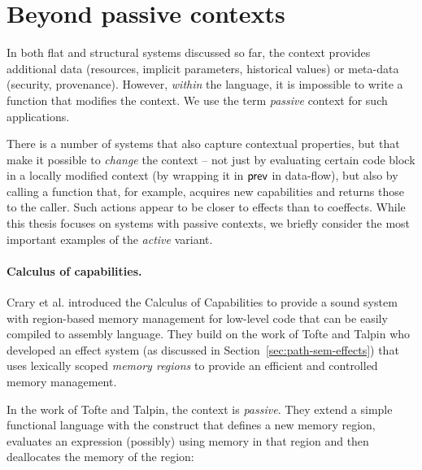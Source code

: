 
\section{Beyond passive contexts}

In both flat and structural systems discussed so far, the context provides additional data (resources,
implicit parameters, historical values) or meta-data (security, provenance). However, \emph{within}
the language, it is impossible to write a function that modifies the context. We use the term
\emph{passive} context for such applications.

There is a number of systems that also capture contextual properties, but that make it possible to
\emph{change} the context -- not just by evaluating certain code block in a locally modified context
(\eg by wrapping it in $\textnormal{\sffamily prev}$ in data-flow), but also by calling a function that, for example,
acquires new capabilities and returns those to the caller. Such actions appear to be closer to
effects than to coeffects. While this thesis focuses on systems with passive contexts, we briefly
consider the most important examples of the \emph{active} variant.


\paragraph{Calculus of capabilities.}
\label{sec:applications-active-ccc}

Crary et al. \cite{app-capabilities} introduced the Calculus of Capabilities to provide
a sound system with region-based memory management for low-level code that can be easily
compiled to assembly language. They build on the work of Tofte and Talpin \cite{app-region-memory}
who developed an effect system (as discussed in Section~\ref{sec:path-sem-effects}) that uses
lexically scoped \emph{memory regions} to provide an efficient and controlled memory management.

In the work of Tofte and Talpin, the context is \emph{passive}. They extend a simple functional language
with the  construct that defines a new memory region, evaluates an expression (possibly)
using memory in that region and then deallocates the memory of the region:


